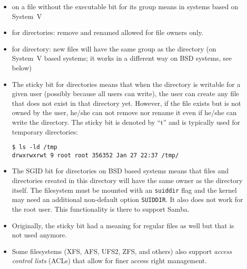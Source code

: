 

\begin{slide}
\begin{center}

\end{center}
\begin{itemize}
\item {} on a file without the executable bit for its group means
 in systems based on System~V
\item {} for directories: remove and renamed allowed for file
owners only.
\item {} for directory: new files will have the same group as the
directory (on System~V based systems; it works in a different way on BSD
systems, see below)
\end{itemize}
\end{slide}

\begin{itemize}
\item The sticky bit for directories means that when the directory is writable
for a given user (possibly because all users can write), the user can create any
file that does not exist in that directory yet.  However, if the file exists but
is not owned by the user, he/she can not remove nor rename it even if
he/she can write the directory.  The sticky bit is denoted by ``t'' and is
typically used for temporary directories:

\begin{verbatim}
$ ls -ld /tmp
drwxrwxrwt 9 root root 356352 Jan 27 22:37 /tmp/
\end{verbatim}

\item The SGID bit for directories on BSD based systems means that files and
directories created in this directory will have the same owner as the directory
itself.  The filesystem must be mounted with an \texttt{suiddir} flag and
the kernel may need an additional non-default option \texttt{SUIDDIR}.  It also
does not work for the root user.  This functionality is there to support Samba.
\item Originally, the sticky bit had a meaning for regular files as well but
that is not used anymore.
\item Some filesystems (XFS, AFS, UFS2, ZFS, and others) also support
\emph{access control lists} (ACLs) that allow for finer access right management.
\end{itemize}


